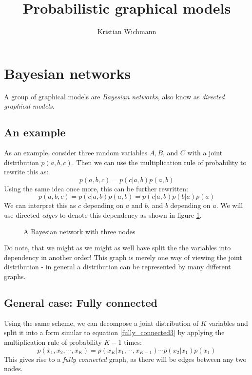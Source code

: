 \documentclass[12pt, a4paper]{article}
\title{Probabilistic graphical models}
\author{Kristian Wichmann}
\numberwithin{equation}{section}
\begin{document}
\maketitle

\section{Bayesian networks}
A group of graphical models are \textit{Bayesian networks}, also know as \textit{directed graphical models}.

\subsection{An example}
As an example, consider three random variables $A, B$, and $C$ with a joint distribution $p(a,b,c)$. Then we can use the multiplication rule of probability to rewrite this as:
\begin{equation}
p(a,b,c)=p(c|a,b)p(a,b)
\end{equation}
Using the same idea once more, this can be further rewritten:
\begin{equation}
p(a,b,c)=p(c|a,b)p(a,b)=p(c|a,b)p(b|a)p(a)
\label{fully_connected3}
\end{equation}
We can interpret this as $c$ depending on $a$ and $b$, and $b$ depending on $a$. We will use directed \textit{edges} to denote this dependency as shown in figure \ref{graph:bn3}.

\begin{figure}
\centering
{}
\caption{A Bayesian network with three nodes}
\label{graph:bn3}
\end{figure}

Do note, that we might as we might as well have split the the variables into dependency in another order! This graph is merely one way of viewing the joint distribution - in general a distribution can be represented by many different graphs.

\subsection{General case: Fully connected}
Using the same scheme, we can decompose a joint distribution of $K$ variables and split it into a form similar to equation \ref{fully_connected3} by applying the multiplication rule of probability $K-1$ times:
\begin{equation}
p(x_1,x_2,\cdots,x_K)=p(x_K|x_1,\cdots,x_{K-1})\cdots p(x_2|x_1)p(x_1)
\label{fully_connectedK}
\end{equation}
This gives rise to a \textit{fully connected} graph, as there will be edges between any two nodes. 
\end{document}
